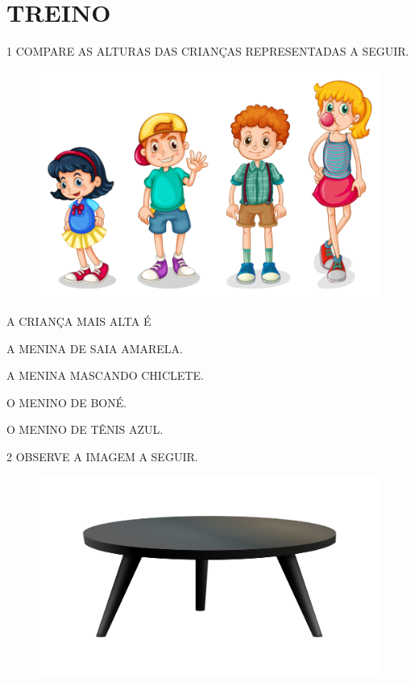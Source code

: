 \section*{TREINO}

\num{1} COMPARE AS ALTURAS DAS CRIANÇAS REPRESENTADAS A SEGUIR.
\enlargethispage{3\baselineskip}


\begin{figure}[H]
\centering
\includegraphics[width=.6\textwidth]{./media/SAEB_1ANO_MAT_FIGURA43.png}
\end{figure}

A CRIANÇA MAIS ALTA É

\begin{escolha}[itemsep=-5pt]
\item A MENINA DE SAIA AMARELA.

\item A MENINA MASCANDO CHICLETE.

\item O MENINO DE BONÉ.

\item O MENINO DE TÊNIS AZUL.
\end{escolha}

\num{2} OBSERVE A IMAGEM A SEGUIR.

\begin{figure}[H]
\centering
\includegraphics[width=.4\textwidth]{media/image32b.jpg}
\end{figure}

